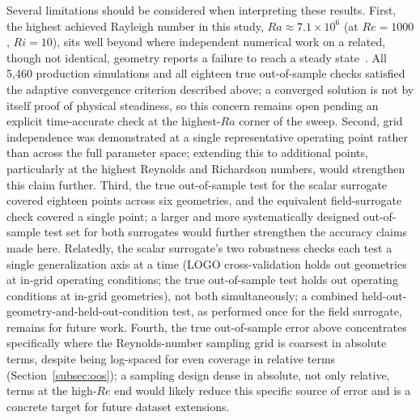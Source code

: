 Several limitations should be considered when interpreting these results. First, the highest achieved Rayleigh number in this study, $Ra \approx 7.1\times10^6$ (at $Re=1000$, $Ri=10$), sits well beyond where independent numerical work on a related, though not identical, geometry reports a failure to reach a steady state~\cite{Pranowo2024}. All 5,460 production simulations and all eighteen true out-of-sample checks satisfied the adaptive convergence criterion described above; a converged solution is not by itself proof of physical steadiness, so this concern remains open pending an explicit time-accurate check at the highest-$Ra$ corner of the sweep. Second, grid independence was demonstrated at a single representative operating point rather than across the full parameter space; extending this to additional points, particularly at the highest Reynolds and Richardson numbers, would strengthen this claim further. Third, the true out-of-sample test for the scalar surrogate covered eighteen points across six geometries, and the equivalent field-surrogate check covered a single point; a larger and more systematically designed out-of-sample test set for both surrogates would further strengthen the accuracy claims made here. Relatedly, the scalar surrogate's two robustness checks each test a single generalization axis at a time (LOGO cross-validation holds out geometries at in-grid operating conditions; the true out-of-sample test holds out operating conditions at in-grid geometries), not both simultaneously; a combined held-out-geometry-and-held-out-condition test, as performed once for the field surrogate, remains for future work. Fourth, the true out-of-sample error above concentrates specifically where the Reynolds-number sampling grid is coarsest in absolute terms, despite being log-spaced for even coverage in relative terms (Section~\ref{subsec:oos}); a sampling design dense in absolute, not only relative, terms at the high-$Re$ end would likely reduce this specific source of error and is a concrete target for future dataset extensions.
